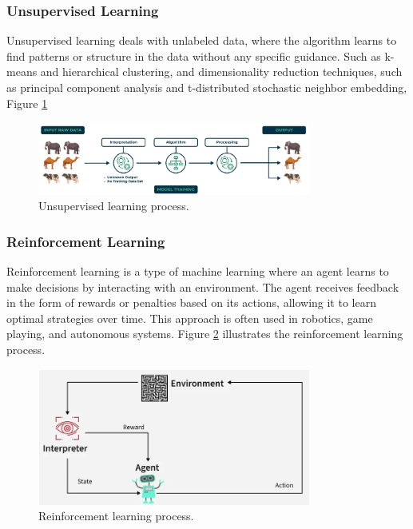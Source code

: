 \subsubsection{Unsupervised Learning}
Unsupervised learning deals with unlabeled data, where the algorithm learns to find patterns or
structure in the data without any specific guidance. Such as k-means and hierarchical
clustering, and dimensionality reduction techniques, such as principal component analysis
and t-distributed stochastic neighbor embedding,  Figure \ref{fig:unsuperml}
\begin{figure}[H]
  \centering
  \includegraphics[width=0.8\textwidth]{Images/Chapter1/unsuperml.png}
  \caption{Unsupervised learning process.}
  \label{fig:unsuperml}
\end{figure}

\subsubsection{Reinforcement Learning}
Reinforcement learning is a type of machine learning where an agent learns to make decisions by interacting with an environment. The agent receives feedback in the form of rewards or penalties based on its actions, allowing it to learn optimal strategies over time. This approach is often used in robotics, game playing, and autonomous systems. Figure \ref{fig:reinforcement} illustrates the reinforcement learning process.
\begin{figure}[H]
  \centering
  \includegraphics[width=0.8\textwidth]{Images/Chapter1/reinforcement.png}
  \caption{Reinforcement learning process.}
  \label{fig:reinforcement}
\end{figure}

